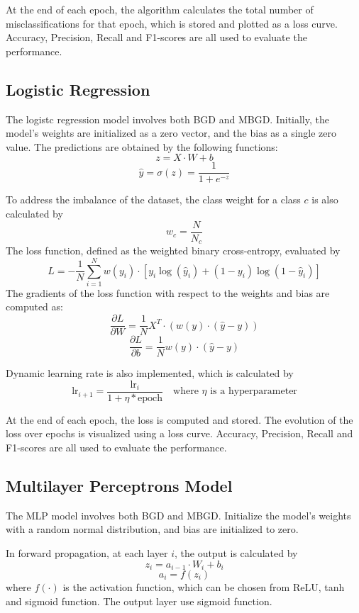 \documentclass{article}
\begin{document}
At the end of each epoch, the algorithm calculates the total number of 
misclassifications for that epoch, which is stored and plotted as a loss curve.
Accuracy, Precision, Recall and F1-scores are all used to evaluate the performance.

\subsection{Logistic Regression}

The logistc regression model involves both BGD and MBGD. Initially, the model's weights are initialized as a zero vector, and the bias
as a single zero value. The predictions are obtained by the following functions:
$$
z=X\cdot W+b
$$
$$
\hat{y}=\sigma(z)=\frac{1}{1+e^{-z}}
$$

To address the imbalance of the dataset, the class weight for a class $c$ is also
calculated by
$$
w_c=\frac{N}{N_c}
$$
The loss function, defined as the weighted binary cross-entropy, evaluated by
$$
L=-\frac{1}{N} \sum_{i=1}^{N} w(y_i)\cdot [y_i\log (\hat{y}_i)+(1-y_i)\log (1-\hat{y}_i)]
$$
The gradients of the loss function with respect to the weights and bias are computed as:
$$
\frac{\partial L}{\partial W}=\frac{1}{N}X^T\cdot(w(y)\cdot(\hat{y}-y))
$$
$$
\frac{\partial L}{\partial b}=\frac{1}{N}w(y)\cdot(\hat{y}-y)
$$

Dynamic learning rate is also implemented, which is calculated by
$$
\text{lr}_{i+1}=\frac{\text{lr}_i}{1+\eta*\text{epoch}} \quad \text{where }\eta\text{ is a hyperparameter}
$$

At the end of each epoch, the loss is computed and stored.
The evolution of the loss over epochs is visualized using a loss curve.
Accuracy, Precision, Recall and F1-scores are all used to evaluate the performance.

\subsection{Multilayer Perceptrons Model}

The MLP model involves both BGD and MBGD. Initialize the model's weights with a random 
normal distribution, and bias are initialized to zero.

In forward propagation, at each layer $i$, the output is calculated by
$$
z_i=a_{i-1}\cdot W_i +b_i
$$
$$
a_i=f(z_i)
$$
where $f(\cdot)$ is the activation function, which can be chosen from ReLU, tanh and
sigmoid function. The output layer use sigmoid function.
\end{document}
